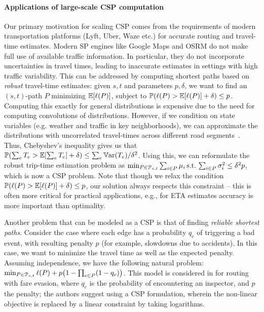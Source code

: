 \paragraph{Applications of large-scale CSP computation}
Our primary motivation for scaling CSP comes from the requirements of modern transportation platforms (Lyft, Uber, Waze etc.) for accurate routing and travel-time estimates.
Modern SP engines like Google Maps and OSRM do not make full use of available traffic information.
In particular, they do not incorporate uncertainties in travel times, leading to inaccurate estimates in settings with high traffic variability.
This can be addressed by computing shortest paths based on \emph{robust} travel-time estimates:
given $s,t$ and parameters $p,\delta$, we want to find an $(s,t)$-path $P$ minimizing $\mathbb{E}[\ell(P)]$, subject to $\mathbb{P}(\ell(P)>\mathbb{E}[\ell(P)]+\delta)\leq p$.
Computing this exactly for general distributions is expensive due to the need for computing convolutions of distributions. 
However, if we condition on state variables (e.g. weather and traffic in key neighborhoods),  we can approximate the distributions with uncorrelated travel-times across different road segments~\cite{woodard2017predicting}. 
Thus, Chebyshev's inequality gives us that $\mathbb{P}(\sum_eT_e>\mathbb{E}[\sum_eT_e]+\delta)\leq \sum_e\mathbb{V}\textnormal{ar}(T_e)/\delta^2$. Using this, we can reformulate the robust trip-time estimation problem as 
$\min_{ P\in\mathcal{P}_{s,t}}\sum_{i\in P}\mu_i \, \mbox{s.t.}\, \sum_{i\in P}\sigma^2_i\leq \delta^2p$, which is now a CSP problem. 
Note that though we relax the condition $\mathbb{P}(\ell(P)>\mathbb{E}[\ell(P)]+\delta)\leq p$, our solution always respects this constraint -- this is often more critical for practical applications, e.g., for ETA estimates accuracy is more important than optimality.

Another problem that can be modeled as a CSP is that of finding \emph{reliable shortest paths}.
Consider the case where each edge has a probability $q_e$ of triggering a bad event, with resulting penalty $p$ (for example, slowdowns due to accidents).
In this case, we want to minimize the travel time as well as the expected penalty.
Assuming independence, we have the following natural problem:
$\min_{P\in\Pst} \ell(P)+p\prn*{1-\prod_{e\in P}(1-q_e)}$.
This model is considered in \cite{fareevasion} for routing with fare evasion, where $q_e$ is the probability of encountering an inspector, and $p$ the penalty; the authors suggest using a CSP formulation, wherein the non-linear objective is replaced by a linear constraint by taking logarithms.


